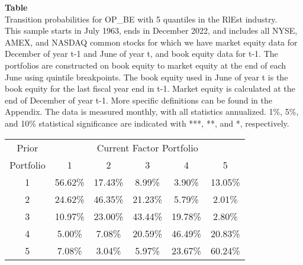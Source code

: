 \begin{table*}[ht!]
\raggedright
{}
\label{tab: transition_probs_OP_BE_RlEst_with_5_quantiles}
\textbf{Table \thetable} \\
Transition probabilities for OP_BE with 5 quantiles in the RlEst industry. \\
\hspace*{1em}This sample starts in July 1963, ends in December 2022, and includes all NYSE, AMEX, and NASDAQ common stocks for which we have market equity data for December of year t-1 and June of year t, and book equity data for t-1. The portfolios are constructed on book equity to market equity at the end of each June using quintile breakpoints.  The book equity used in June of year t is the book equity for the last fiscal year end in t-1.  Market equity is calculated at the end of December of year t-1.  More specific definitions can be found in the Appendix.  The data is measured monthly, with all statistics annualized.  1\%, 5\%, and 10\% statistical significance are indicated with ***, **, and *, respectively. \\
\vspace{0.5em}
\centering
\begin{adjustbox}{max width=\textwidth}
\begin{tabular}{@{}cccccc@{}}
\toprule
Prior & \multicolumn{5}{c}{Current Factor Portfolio} \\
Portfolio & 1 & 2 & 3 & 4 & 5 \\
\midrule
1 & 56.62\% & 17.43\% & 8.99\% & 3.90\% & 13.05\% \\
2 & 24.62\% & 46.35\% & 21.23\% & 5.79\% & 2.01\% \\
3 & 10.97\% & 23.00\% & 43.44\% & 19.78\% & 2.80\% \\
4 & 5.00\% & 7.08\% & 20.59\% & 46.49\% & 20.83\% \\
5 & 7.08\% & 3.04\% & 5.97\% & 23.67\% & 60.24\% \\
\bottomrule
\end{tabular}
\end{adjustbox}
\end{table*}